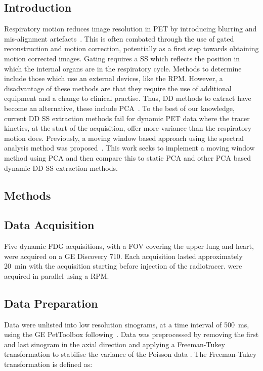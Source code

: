         \subsection{Introduction} \label{sec:pca_data_driven_surrogate_signal_extraction_methods_for_Dynamic_pet_introduction}
            Respiratory motion reduces image resolution in \gls{PET} by introducing blurring and mis-alignment artefacts~\cite{Nehmeh2008a}. This is often combated through the use of gated reconstruction and motion correction, potentially as a first step towards obtaining motion corrected images. Gating requires a \gls{SS} which reflects the position in which the internal organs are in the respiratory cycle. Methods to determine  include those which use an external devices, like the \gls{RPM}. However, a disadvantage of these methods are that they require the use of additional equipment and a change to clinical practise. Thus, \gls{DD} methods to extract  have become an alternative, these include \gls{PCA}~\cite{Thielemans2011}. To the best of our knowledge, current \gls{DD} \gls{SS} extraction methods fail for dynamic \gls{PET} data where the tracer kinetics, at the start of the acquisition, offer more variance than the respiratory motion does. Previously, a moving window based approach using the spectral analysis method was proposed~\cite{Schleyer2014}. This work seeks to implement a moving window method using \gls{PCA} and then compare this to static \gls{PCA} and other \gls{PCA} based dynamic \gls{DD} \gls{SS} extraction methods.
        
        \subsection{Methods} \label{sec:pca_data_driven_surrogate_signal_extraction_methods_for_Dynamic_pet_methods}
            \subsection{Data Acquisition} \label{sec:pca_data_driven_surrogate_signal_extraction_methods_for_Dynamic_pet_data_acquisition}
                Five dynamic \gls{FDG} acquisitions, with a \gls{FOV} covering the upper lung and heart, were acquired on a \gls{GE} Discovery $710$. Each acquisition lasted approximately \SI{20}{\minute} with the acquisition starting before injection of the radiotracer.  were acquired in parallel using a \gls{RPM}.
                
            \subsection{Data Preparation} \label{sec:pca_data_driven_surrogate_signal_extraction_methods_for_Dynamic_pet_data_preparation}
                Data were unlisted into low resolution sinograms, at a time interval of \SI{500}{\milli\second}, using the \gls{GE} PetToolbox following~\cite{Bertolli2018Data-DrivenTomography}. Data was preprocessed by removing the first and last sinogram in the axial direction and applying a Freeman-Tukey transformation to stabilise the variance of the Poisson data \cite{Freeman1950TransformationsRoot}. The Freeman-Tukey transformation is defined as:

